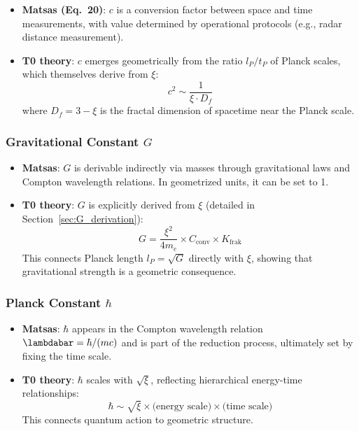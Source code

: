 	\begin{itemize}
		\item \textbf{Matsas (Eq.~20)}: $c$ is a conversion factor between space and time measurements, with value determined by operational protocols (e.g., radar distance measurement).
		
		\item \textbf{T0 theory}: $c$ emerges geometrically from the ratio $l_P/t_P$ of Planck scales, which themselves derive from $\xi$:
		\[
		c^2 \sim \frac{1}{\xi \cdot D_f}
		\]
		where $D_f = 3 - \xi$ is the fractal dimension of spacetime near the Planck scale.
	\end{itemize}
	
	\subsubsection{Gravitational Constant $G$}
	
	\begin{itemize}
		\item \textbf{Matsas}: $G$ is derivable indirectly via masses through gravitational laws and Compton wavelength relations. In geometrized units, it can be set to 1.
		
		\item \textbf{T0 theory}: $G$ is explicitly derived from $\xi$ (detailed in Section~\ref{sec:G_derivation}):
		\[
		G = \frac{\xi^2}{4 m_e} \times C_{\text{conv}} \times K_{\text{frak}}
		\]
		This connects Planck length $l_P = \sqrt{G}$ directly with $\xi$, showing that gravitational strength is a geometric consequence.
	\end{itemize}
	
	\subsubsection{Planck Constant $\hbar$}
	
	\begin{itemize}
		\item \textbf{Matsas}: $\hbar$ appears in the Compton wavelength relation $\lambdabar = \hbar/(mc)$ and is part of the reduction process, ultimately set by fixing the time scale.
		
		\item \textbf{T0 theory}: $\hbar$ scales with $\sqrt{\xi}$, reflecting hierarchical energy-time relationships:
		\[
		\hbar \sim \sqrt{\xi} \times \text{(energy scale)} \times \text{(time scale)}
		\]
		This connects quantum action to geometric structure.
	\end{itemize}
	
